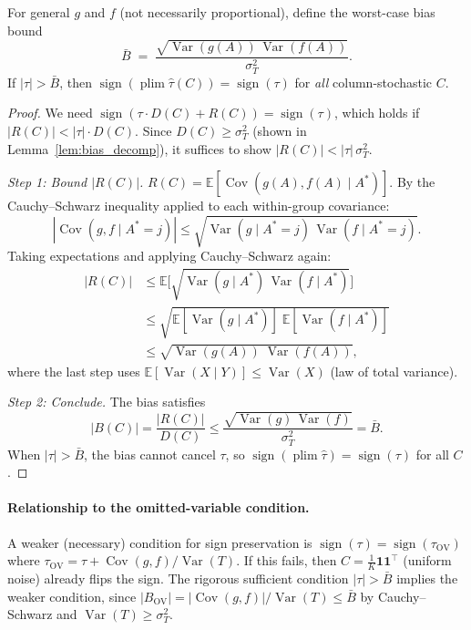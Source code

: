 \begin{proposition}
\label{prop:conf_gen}
For general $g$ and $f$ (not necessarily proportional), define the worst-case bias bound
\begin{equation}
  \bar{B} \;=\; \frac{\sqrt{\operatorname{Var}(g(A))\,\operatorname{Var}(f(A))}}{\sigma_T^2}.
  \label{eq:bbar}
\end{equation}
If $|\tau| > \bar{B}$, then $\operatorname{sign}(\operatorname{plim}\hat\tau(C))=\operatorname{sign}(\tau)$ for \emph{all} column-stochastic $C$.
\end{proposition}

\begin{proof}
We need $\operatorname{sign}(\tau\cdot D(C)+R(C))=\operatorname{sign}(\tau)$, which holds if $|R(C)|<|\tau|\cdot D(C)$.
Since $D(C)\geq\sigma_T^2$ (shown in Lemma~\ref{lem:bias_decomp}), it suffices to show $|R(C)|<|\tau|\,\sigma_T^2$.

\emph{Step 1: Bound $|R(C)|$.}
$R(C)=\mathbb{E}[\operatorname{Cov}(g(A),f(A)\mid A^*)]$.
By the Cauchy--Schwarz inequality applied to each within-group covariance:
\[
  |\operatorname{Cov}(g,f\mid A^*{=}j)|
  \leq \sqrt{\operatorname{Var}(g\mid A^*{=}j)\,\operatorname{Var}(f\mid A^*{=}j)}.
\]
Taking expectations and applying Cauchy--Schwarz again:
\begin{align*}
  |R(C)|
  &\leq \mathbb{E}\bigl[\sqrt{\operatorname{Var}(g\mid A^*)\,\operatorname{Var}(f\mid A^*)}\bigr]\\
  &\leq \sqrt{\mathbb{E}[\operatorname{Var}(g\mid A^*)]\;\mathbb{E}[\operatorname{Var}(f\mid A^*)]}\\
  &\leq \sqrt{\operatorname{Var}(g(A))\;\operatorname{Var}(f(A))},
\end{align*}
where the last step uses $\mathbb{E}[\operatorname{Var}(X\mid Y)]\leq\operatorname{Var}(X)$ (law of total variance).

\emph{Step 2: Conclude.}
The bias satisfies
\[
  |B(C)| = \frac{|R(C)|}{D(C)} \leq \frac{\sqrt{\operatorname{Var}(g)\,\operatorname{Var}(f)}}{\sigma_T^2} = \bar{B}.
\]
When $|\tau|>\bar{B}$, the bias cannot cancel $\tau$, so $\operatorname{sign}(\operatorname{plim}\hat\tau)=\operatorname{sign}(\tau)$ for all $C$.
\end{proof}

\paragraph{Relationship to the omitted-variable condition.}
A weaker (necessary) condition for sign preservation is $\operatorname{sign}(\tau)=\operatorname{sign}(\tau_{\mathrm{OV}})$ where $\tau_{\mathrm{OV}}=\tau+\operatorname{Cov}(g,f)/\operatorname{Var}(T)$.
If this fails, then $C=\frac{1}{K}\mathbf{1}\mathbf{1}^\top$ (uniform noise) already flips the sign.
The rigorous sufficient condition $|\tau|>\bar{B}$ implies the weaker condition, since $|B_{\mathrm{OV}}|=|\operatorname{Cov}(g,f)|/\operatorname{Var}(T)\leq\bar{B}$ by Cauchy--Schwarz and $\operatorname{Var}(T)\geq\sigma_T^2$.

